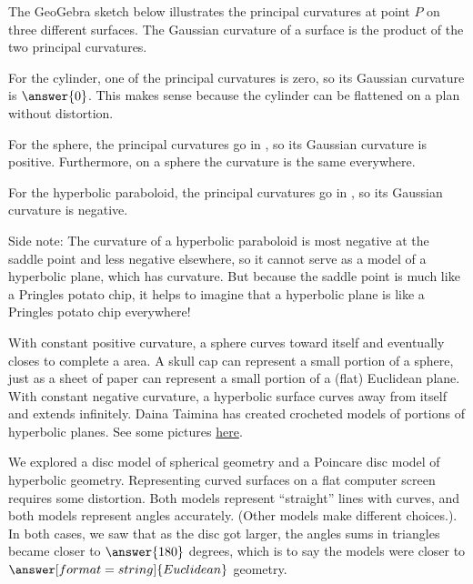 \documentclass{ximera}
\begin{document}
\begin{problem}
The GeoGebra sketch below illustrates the principal curvatures at point $P$ on three different surfaces.  The Gaussian curvature of a surface is the product of the two principal curvatures.  
\begin{center}
\end{center}

For the cylinder, one of the principal curvatures is zero, so its Gaussian curvature is $\answer{0}$.  This makes sense because the cylinder can be flattened on a plan without distortion.  

For the sphere, the principal curvatures go in , so its Gaussian curvature is positive.  Furthermore, on a sphere the curvature is the same everywhere.  
 
For the hyperbolic paraboloid, the principal curvatures go in , so its Gaussian curvature is 
negative.  

Side note: The curvature of a hyperbolic paraboloid is most negative at the saddle point and less negative elsewhere, so it cannot serve as a model of a hyperbolic plane, which has  curvature.  But because the saddle point is much like a Pringles potato chip, it helps to imagine that a hyperbolic plane is like a Pringles potato chip everywhere!  
\end{problem}

\begin{problem}
With constant positive curvature, a sphere curves toward itself and eventually closes to complete a  area.  A skull cap can represent a small portion of a sphere, just as a sheet of paper can represent a small portion of a (flat) Euclidean plane.  With constant negative curvature, a hyperbolic surface curves away from itself and extends infinitely.  Daina Taimina has created crocheted models of portions of hyperbolic planes.  See some pictures \href{https://www.theiff.org/oexhibits/oe1e.html}{here}.  

We explored a disc model of spherical geometry and a Poincare disc model of hyperbolic geometry.  Representing curved surfaces on a flat computer screen requires some distortion.  Both models represent ``straight'' lines with curves, and both models represent angles accurately.  (Other models make different choices.). In both cases, we saw that as the disc got larger, the angles sums in triangles became closer to $\answer{180}$ degrees, which is to say the models were closer to $\answer[format=string]{Euclidean}$ geometry.  
\end{problem}
\end{document}
